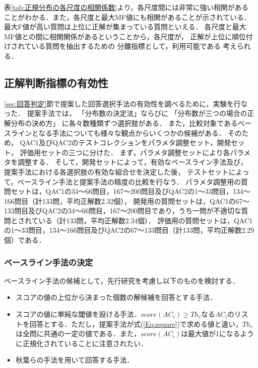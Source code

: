 \documentclass[japanese]{jnlp_1.4}
\begin{document}
表\ref{tab:正規分布の各尺度の相関係数}より，各尺度間には非常に強い相関があることがわかる．また，各尺度と最大MF値にも相関があることが示されている．
最大F値が高い質問は上位に正解が集まっている質問といえる．
各尺度と最大MF値との間に相関関係があるということから，各尺度が，
正解が上位に順位付けされている質問を抽出するための
分離指標として，利用可能である
考えられる．


\subsection{正解判断指標の有効性}\label{sec:正解判断指標の有効性}

\ref{sec:回答判定}節で提案した回答選択手法の有効性を調べるために，実験を行なった．
提案手法では，
「分布数の決定法」ならびに
「分布数が三つの場合の正解分布の決め方」
に各々数種類ずつ選択肢がある．
また，比較対象であるベースラインとなる手法についても様々な観点からいくつかの候補がある．
そのため，
QAC1及びQAC2のテストコレクションをパラメタ調整セット，開発セット，
評価用セットの三つに分けた．
まず，パラメタ調整セットにより各パラメタを調整する．
そして，開発セットによって，有効なベースライン手法及び，
提案手法における各選択肢の有効な組合せを決定した後，
テストセットによって，ベースライン手法と提案手法の精度の比較を行なう．
パラメタ調整用の質問セットは，QAC1の34〜66問目，167〜200問目及びQAC2の1〜33問目，134〜166問目（計133問，平均正解数2.32個），
開発用の質問セットは，QAC1の67〜133問目及びQAC2の34〜66問目，167〜200問目であり，うち一問が不適切な質問とされている（計133問，平均正解数2.34個）．
評価用の質問セットは，QAC1の1〜33問目，134〜166問目及びQAC2の67〜133問目（計133問，平均正解数2.29個）である．


\subsubsection{ベースライン手法の決定}\label{subsubsec:ベースライン}

ベースライン手法の候補として，先行研究を考慮し以下のものを検討する．
\begin{itemize}
\item スコアの値の上位から決まった個数の解候補を回答とする手法．
\item スコアの値に単純な閾値を設ける手法．$score(AC_i) \ge  Th_r$なる$AC_i$のリストを回答とする．ただし，提案手法が式(\ref{Eq:square})で求める値と違い，$Th_r$は全問に共通の一定の値である．また，$score(AC_i)$は最大値が1になるように正規化されていることに注意されたい．
\item 秋葉ら\cite{秋葉:質問応答における常識的な解の選択と期待効用に基づく回答群の決定}の手法を用いて回答する手法．
\end{itemize}
\end{document}
